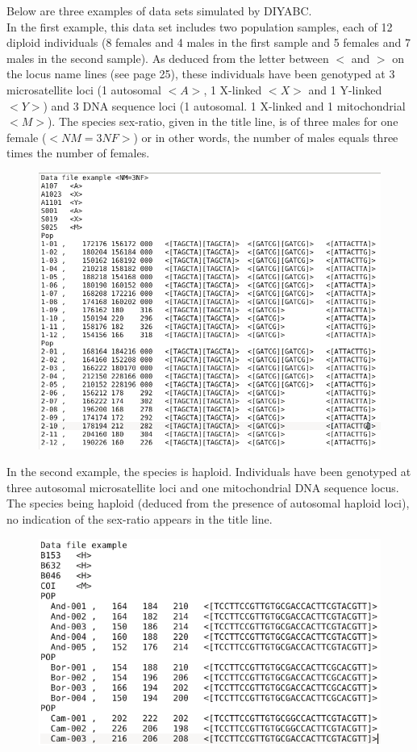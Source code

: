  
Below are three examples of data sets simulated by DIYABC.\\ In the first example, this data set includes two population samples, each of 12 diploid individuals (8 females and 4 males in the first sample and 5 females and 7 males in the second sample). As deduced from the letter between $<$ and $>$ on the locus name lines (see page 25), these individuals have been genotyped at 3 microsatellite loci (1 autosomal $<A>$, 1 X-linked $<X>$ and 1 Y-linked $<Y>$) and 3 DNA sequence loci (1 autosomal. 1 X-linked and 1 mitochondrial $<M>$). The species sex-ratio, given in the title line, is of three males for one female ($<NM=3NF>$) or in other words, the number of males equals three times the number of females. 
\begin{figure}[h]
\includegraphics[scale=0.5]{gui_pictures/screenga001.png}
\end{figure}

In the second example, the species is haploid. Individuals have been genotyped at three autosomal microsatellite loci and one mitochondrial DNA sequence locus. The species being haploid (deduced from the presence of autosomal haploid loci), no indication of the sex-ratio appears in the title line.

\begin{figure}[h]
\includegraphics[scale=0.5]{gui_pictures/screenga002.png}
\end{figure}

